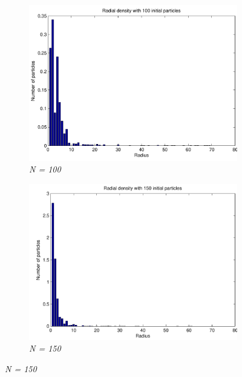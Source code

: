 \documentclass[a4paper,12pt, english]{article}
\begin{document}
\begin{figure}[H]
	\centering
        \begin{subfigure}[b]{0.6\textwidth}
        \includegraphics[scale=0.5]{Radial_densit_100.pdf}
        \caption{\textit{N = 100}}
        
		\end{subfigure}
		
		\begin{subfigure}[b]{0.6\textwidth}
        \includegraphics[scale=0.5]{Radial_density_150.pdf}
        \caption{\textit{N = 150}}
		\end{subfigure}
		

\end{figure}
\end{document}
